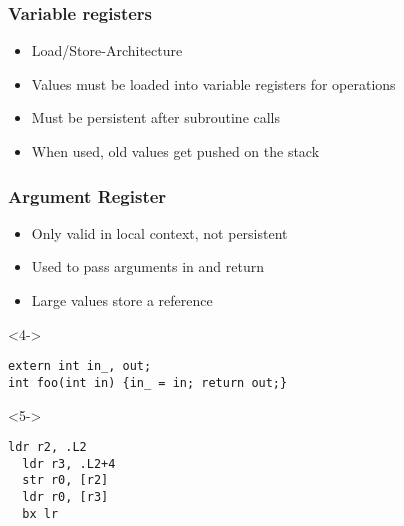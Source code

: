 \documentclass{beamer}
\begin{document}
\begin{frame}
\frametitle{Variable registers}
\begin{itemize}
\item<1-> Load/Store-Architecture
\item<2-> Values must be loaded into variable registers for operations
\item<3-> Must be persistent after subroutine calls
\item<4-> When used, old values get pushed on the stack
\end{itemize}

\end{frame}

\begin{frame}[fragile]
\frametitle{Argument Register}
\begin{itemize}
\item<1-> Only valid in local context, not persistent
\item<2-> Used to pass arguments in and return
\item<3-> Large values store a reference
\end{itemize}

\begin{block}<4->{}
\begin{lstlisting}
extern int in_, out;
int foo(int in) {in_ = in; return out;}
\end{lstlisting}
\end{block}

\begin{block}<5->{}
\begin{lstlisting}[language=ASM]
  ldr r2, .L2
  ldr r3, .L2+4
  str r0, [r2]
  ldr r0, [r3]
  bx lr
\end{lstlisting}
\end{block}

\end{frame}
\end{document}
